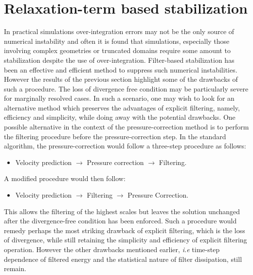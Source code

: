 \section{Relaxation-term based stabilization}

In practical simulations over-integration errors may not be the only source of numerical instability and often it is found that simulations, especially those involving complex geometries or truncated domains require some amount to stabilization despite the use of over-integration. Filter-based stabilization has been an effective and efficient method to suppress such numerical instabilities. However the results of the previous section highlight some of the drawbacks of such a procedure. The loss of divergence free condition may be particularly severe for marginally resolved cases. In such a scenario, one may wish to look for an alternative method which preserves the advantages of explicit filtering, namely, efficiency and simplicity, while doing away with the potential drawbacks. One possible alternative in the context of the pressure-correction method is to perform the filtering procedure before the pressure-correction step. In the standard algorithm, the pressure-correction would follow a three-step procedure as follows: 
\begin{itemize}
	\item Velocity prediction $\rightarrow$ Pressure correction $\rightarrow$ Filtering.
\end{itemize}
A modified procedure would then follow:
\begin{itemize}
	\item Velocity prediction $\rightarrow$ Filtering $\rightarrow$ Pressure Correction.
\end{itemize}
This allows the filtering of the highest scales but leaves the solution unchanged after the divergence-free condition has been enforced. Such a procedure would remedy perhaps the most striking drawback of explicit filtering, which is the loss of divergence, while still retaining the simplicity and efficiency of explicit filtering operation. However the other drawbacks mentioned earlier, \textit{i.e} time-step dependence of filtered energy and the statistical nature of filter dissipation, still remain.


